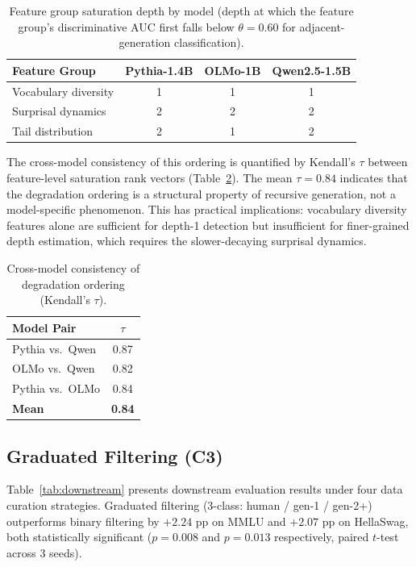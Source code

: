 \documentclass[11pt,a4paper]{article}
\begin{document}
\begin{table}[t]
\centering
\small
\caption{Feature group saturation depth by model (depth at which the feature group's discriminative AUC first falls below $\theta{=}0.60$ for adjacent-generation classification).}
\label{tab:degradation}
\begin{tabular}{@{}lccc@{}}
\toprule
\textbf{Feature Group} & \textbf{Pythia-1.4B} & \textbf{OLMo-1B} & \textbf{Qwen2.5-1.5B} \\
\midrule
Vocabulary diversity & 1 & 1 & 1 \\
Surprisal dynamics & 2 & 2 & 2 \\
Tail distribution & 2 & 1 & 2 \\
\bottomrule
\end{tabular}
\end{table}

The cross-model consistency of this ordering is quantified by Kendall's $\tau$ between feature-level saturation rank vectors (Table~\ref{tab:kendall}). The mean $\tau{=}0.84$ indicates that the degradation ordering is a structural property of recursive generation, not a model-specific phenomenon. This has practical implications: vocabulary diversity features alone are sufficient for depth-1 detection but insufficient for finer-grained depth estimation, which requires the slower-decaying surprisal dynamics.

\begin{table}[t]
\centering
\small
\caption{Cross-model consistency of degradation ordering (Kendall's $\tau$).}
\label{tab:kendall}
\begin{tabular}{@{}lc@{}}
\toprule
\textbf{Model Pair} & \textbf{$\tau$} \\
\midrule
Pythia vs.\ Qwen & 0.87 \\
OLMo vs.\ Qwen & 0.82 \\
Pythia vs.\ OLMo & 0.84 \\
\midrule
\textbf{Mean} & \textbf{0.84} \\
\bottomrule
\end{tabular}
\end{table}

\subsection{Graduated Filtering (C3)}
\label{sec:filtering_results}

Table~\ref{tab:downstream} presents downstream evaluation results under four data curation strategies. Graduated filtering (3-class: human / gen-1 / gen-2+) outperforms binary filtering by $+2.24$ pp on MMLU and $+2.07$ pp on HellaSwag, both statistically significant ($p{=}0.008$ and $p{=}0.013$ respectively, paired $t$-test across 3 seeds).
\end{document}
